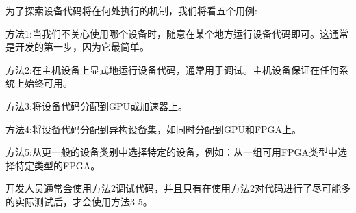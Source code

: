 为了探索设备代码将在何处执行的机制，我们将看五个用例:\par

方法1:当我们不关心使用哪个设备时，随意在某个地方运行设备代码即可。这通常是开发的第一步，因为它最简单。\par

方法2:在主机设备上显式地运行设备代码，通常用于调试。主机设备保证在任何系统上始终可用。\par

方法3:将设备代码分配到GPU或加速器上。\par

方法4:将设备代码分配到异构设备集，如同时分配到GPU和FPGA上。\par

方法5:从更一般的设备类别中选择特定的设备，例如：从一组可用FPGA类型中选择特定类型的FPGA。\par

\begin{tcolorbox}[colback=red!5!white,colframe=red!75!black]
开发人员通常会使用方法2调试代码，并且只有在使用方法2对代码进行了尽可能多的实际测试后，才会使用方法3-5。
\end{tcolorbox}













